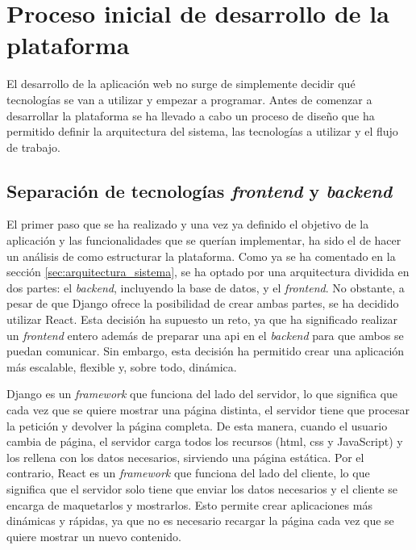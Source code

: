 \section{Proceso inicial de desarrollo de la plataforma}
\label{sec:proceso_desarrollo}

El desarrollo de la aplicación web no surge de simplemente decidir qué tecnologías se van a utilizar y empezar a programar. Antes de comenzar a desarrollar la plataforma se ha llevado a cabo un proceso de diseño que ha permitido definir la arquitectura del sistema, las tecnologías a utilizar y el flujo de trabajo.

\subsection{Separación de tecnologías \textit{frontend} y \textit{backend}}
\label{dev:subsec:separacion_frontend_backend}

El primer paso que se ha realizado y una vez ya definido el objetivo de la aplicación y las funcionalidades que se querían implementar, ha sido el de hacer un análisis de como estructurar la plataforma. Como ya se ha comentado en la sección \ref{sec:arquitectura_sistema}, se ha optado por una arquitectura dividida en dos partes: el \textit{backend}, incluyendo la base de datos, y el \textit{frontend}. No obstante, a pesar de que Django ofrece la posibilidad de crear ambas partes, se ha decidido utilizar React. Esta decisión ha supuesto un reto, ya que ha significado realizar un \textit{frontend} entero además de preparar una \gls{api} en el \textit{backend} para que ambos se puedan comunicar. Sin embargo, esta decisión ha permitido crear una aplicación más escalable, flexible y, sobre todo, dinámica.

Django es un \textit{framework} que funciona del lado del servidor, lo que significa que cada vez que se quiere mostrar una página distinta, el servidor tiene que procesar la petición y devolver la página completa. De esta manera, cuando el usuario cambia de página, el servidor carga todos los recursos (\gls{html}, \gls{css} y JavaScript) y los rellena con los datos necesarios, sirviendo una página estática. Por el contrario, React es un \textit{framework} que funciona del lado del cliente, lo que significa que el servidor solo tiene que enviar los datos necesarios y el cliente se encarga de maquetarlos y mostrarlos. Esto permite crear aplicaciones más dinámicas y rápidas, ya que no es necesario recargar la página cada vez que se quiere mostrar un nuevo contenido.

